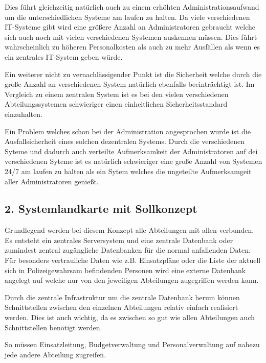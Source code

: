 \documentclass[12pt,utf8]{scrartcl}
\begin{document}
Dies führt gleichzeitig natürlich auch zu einem erhöhten Administrationsaufwand um die unterschiedlichen Systeme am laufen zu halten. Da viele verschiedenen IT-Systeme gibt wird eine größere Anzahl an Administratoren gebraucht welche sich auch noch  mit vielen verschiedenen Systemen auskennen müssen. Dies führt wahrscheinlich zu höheren Personalkosten als auch zu mehr Ausfällen als wenn es ein zentrales IT-System geben würde.

Ein weiterer nicht zu vernachlässigender Punkt ist die Sicherheit welche durch die große Anzahl an verschiedenen System natürlich ebenfalls beeinträchtigt ist. Im Vergleich zu einem zentralen System ist es bei den vielen verschiedenen Abteilungssystemen schwieriger einen einheitlichen Sicherheitsstandard einzuhalten.

Ein Problem welches schon bei der Administration angesprochen wurde ist die Ausfallsicherheit eines solchen dezentralen Systems. Durch die verschiedenen Syteme und dadurch auch verteilte Aufmerksamkeit der Administratoren auf dei verschiedenen Syteme ist es natürlich schwieriger eine große Anzahl von Systemen 24/7 am laufen zu halten als ein Sytem welches die ungeteilte Aufmerksamgeit aller Administratoren genießt.\cite{APariConsulting}


\subsection*{\label{sub:thema}2. Systemlandkarte mit Sollkonzept}

Grundlegend werden bei diesem Konzept alle Abteilungen mit allen verbunden. Es entsteht ein zentrales Serversystem und eine zentrale Datenbank oder zumindest zentral zugängliche Datenbanken für die normal anfallenden Daten. Für besonders vertrauliche Daten wie z.B. Einsatzpläne oder die Liste der aktuell sich in Polizeigewahrsam befindenden Personen wird eine externe Datenbank angelegt auf welche nur von den jeweiligen Abteilungen zugegriffen werden kann.

Durch die zentrale Infrastruktur um die zentrale Datenbank herum können Schnittstellen zwischen den einzelnen Abteilungen relativ einfach realisiert werden. Dies ist auch wichtig, da es zwischen so gut wie allen Abteilungen auch Schnittstellen benötigt werden. 

So müssen Einsatzleitung, Budgetverwaltung und Personalverwaltung auf nahezu jede andere Abteilung zugreifen.
\end{document}

